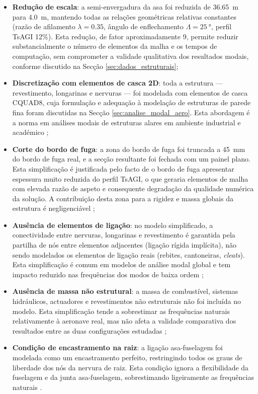 \documentclass[a4paper,fleqn,noprintline]{cas-dc}
\begin{document}
\begin{itemize}
    \item \textbf{Redução de escala}: a semi-envergadura da asa foi reduzida de \SI{36.65}{\meter} para \SI{4.0}{\meter}, mantendo todas as relações geométricas relativas constantes (razão de afilamento $\lambda = 0.35$, ângulo de enflechamento $\Lambda = \qty{25}{\degree}$, perfil TsAGI 12\%). Esta redução, de fator aproximadamente 9, permite reduzir substancialmente o número de elementos da malha e os tempos de computação, sem comprometer a validade qualitativa dos resultados modais, conforme discutido na Secção \ref{sec:dados_estruturais};

    \item \textbf{Discretização com elementos de casca 2D}: toda a estrutura --- revestimento, longarinas e nervuras --- foi modelada com elementos de casca CQUAD8, cuja formulação e adequação à modelação de estruturas de parede fina foram discutidas na Secção \ref{sec:analise_modal_aero}. Esta abordagem é a norma em análises modais de estruturas alares em ambiente industrial e académico \cite{Nastran2014, Cook2001};

    \item \textbf{Corte do bordo de fuga}: a zona do bordo de fuga foi truncada a \SI{45}{\milli\meter} do bordo de fuga real, e a secção resultante foi fechada com um painel plano. Esta simplificação é justificada pelo facto de o bordo de fuga apresentar espessura muito reduzida do perfil TsAGI, o que geraria elementos de malha com elevada razão de aspeto e consequente degradação da qualidade numérica da solução. A contribuição desta zona para a rigidez e massa globais da estrutura é negligenciável \cite{Bathe2014};

    \item \textbf{Ausência de elementos de ligação}: no modelo simplificado, a conectividade entre nervuras, longarinas e revestimento é garantida pela partilha de nós entre elementos adjacentes (ligação rígida implícita), não sendo modelados os elementos de ligação reais (rebites, cantoneiras, \textit{cleats}). Esta simplificação é comum em modelos de análise modal global e tem impacto reduzido nas frequências dos modos de baixa ordem \cite{Wright2015};

    \item \textbf{Ausência de massa não estrutural}: a massa de combustível, sistemas hidráulicos, actuadores e revestimentos não estruturais não foi incluída no modelo. Esta simplificação tende a sobrestimar as frequências naturais relativamente à aeronave real, mas não afeta a validade comparativa dos resultados entre as duas configurações estudadas \cite{Craig2006};

    \item \textbf{Condição de encastramento na raiz}: a ligação asa-fuselagem foi modelada como um encastramento perfeito, restringindo todos os graus de liberdade dos nós da nervura de raiz. Esta condição ignora a flexibilidade da fuselagem e da junta asa-fuselagem, sobrestimando ligeiramente as frequências naturais \cite{Hodges2011}.
\end{itemize}
\end{document}
